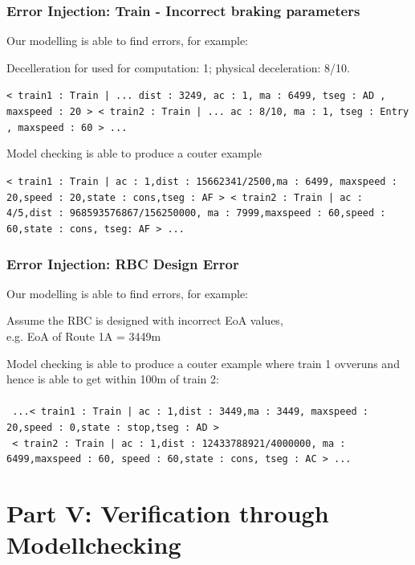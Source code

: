 \documentclass{beamer}
\begin{document}
\begin{frame}
\frametitle{Error Injection: Train - Incorrect  braking parameters}
Our modelling is able to find errors, for example:
\begin{center}
Decelleration for used for computation: 1; physical deceleration: 8/10.
\end{center}

\texttt{\small {< train1 : Train | ...  dist : 3249, ac : 1, ma : 6499, tseg : AD , maxspeed : 20 >
    < train2 : Train |  ... ac : 8/10, ma : 1, tseg : Entry , maxspeed : 60 > ...}}

\bigskip

Model checking is able to produce a couter example
\bigskip

\texttt{\small{< train1 : Train | ac : 1,dist : 15662341/2500,ma : 6499,
      maxspeed : 20,speed : 20,state : cons,tseg : AF >
    < train2 : Train | ac : 4/5,dist : 968593576867/156250000,
      ma : 7999,maxspeed : 60,speed : 60,state : cons,
      tseg: AF > ...}}
\end{frame}

\begin{frame}
\frametitle{Error Injection: RBC Design Error}
Our modelling is able to find errors, for example:

\begin{center}
Assume the RBC is designed with incorrect EoA values, \\e.g. EoA of Route 1A = 3449m
\end{center}

Model checking is able to produce a couter example where train 1 ovveruns and hence is able to get within 100m of train 2:\\ \quad \\
\texttt{
...< train1 : Train | ac : 1,dist : 3449,ma : 3449,
      maxspeed : 20,speed : 0,state : stop,tseg : AD >}\\
\texttt{
< train2 : Train | ac : 1,dist : 12433788921/4000000,
      ma : 6499,maxspeed : 60, speed : 60,state : cons,
      tseg : AC > ...
}
\end{frame}


\section{Part V: Verification through Modellchecking}
\end{document}
